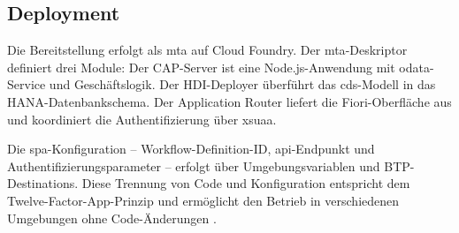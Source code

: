 \subsection{Deployment}

Die Bereitstellung erfolgt als \gls{mta} auf Cloud Foundry. Der \gls{mta}-Deskriptor definiert drei Module: Der CAP-Server ist eine Node.js-Anwendung mit \gls{odata}-Service und Geschäftslogik. Der HDI-Deployer überführt das \gls{cds}-Modell in das HANA-Datenbankschema. Der Application Router liefert die Fiori-Oberfläche aus und koordiniert die Authentifizierung über \gls{xsuaa}.

Die \gls{spa}-Konfiguration -- Workflow-Definition-ID, \gls{api}-Endpunkt und Authentifizierungsparameter -- erfolgt über Umgebungsvariablen und BTP-Destinations. Diese Trennung von Code und Konfiguration entspricht dem Twelve-Factor-App-Prinzip und ermöglicht den Betrieb in verschiedenen Umgebungen ohne Code-Änderungen \citep{wiggins2017twelvefactor}.
